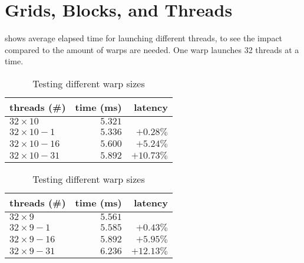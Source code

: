 \section{Grids, Blocks, and Threads}
\label{sec:grids blocks threads}

 shows average elapsed time for launching different threads, to see the impact compared to the amount of warps are needed.
One warp launches 32 threads at a time.

\begin{table}[htb]%
  \begin{minipage}{0.49\linewidth}
    \centering
    \begin{tabular}{lrr}
      \toprule
      threads (\#) & time (ms) & latency \\
      \midrule
      $32 \times 10$    & $5.321$ &          \\
      $32 \times 10-1$  & $5.336$ & $+0.28\%$  \\
      $32 \times 10-16$ & $5.600$ & $+5.24\%$  \\
      $32 \times 10-31$ & $5.892$ & $+10.73\%$ \\
      \bottomrule
    \end{tabular}
  \end{minipage}%
  \begin{minipage}{0.49\linewidth}
    \centering
    \begin{tabular}{lrr}
      \toprule
      threads (\#) & time (ms) & latency \\
      \midrule
      $32 \times 9$     & $5.561$ & \\
      $32 \times 9-1$   & $5.585$ & $+0.43\%$  \\
      $32 \times 9-16$  & $5.892$ & $+5.95\%$  \\
      $32 \times 9-31$  & $6.236$ & $+12.13\%$ \\
      \bottomrule
    \end{tabular}
  \end{minipage}%
  \caption{Testing different warp sizes}
  \label{tab:warp size testing}
\end{table}
